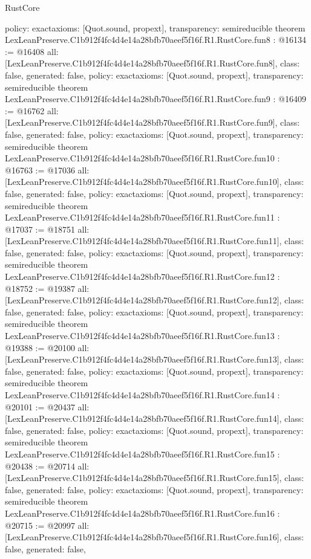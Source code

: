 \begin{lexlean}{RustCore}
\begin{coremodule}
{  policy: exact{axioms: [Quot.sound, propext]},
  transparency: semireducible
}
theorem LexLeanPreserve.C1b912f4fc4d4e14a28bfb70aeef5f16f.R1.RustCore.fun8 : @16134 := @16408 {
  all: [LexLeanPreserve.C1b912f4fc4d4e14a28bfb70aeef5f16f.R1.RustCore.fun8],
  class: false,
  generated: false,
  policy: exact{axioms: [Quot.sound, propext]},
  transparency: semireducible
}
theorem LexLeanPreserve.C1b912f4fc4d4e14a28bfb70aeef5f16f.R1.RustCore.fun9 : @16409 := @16762 {
  all: [LexLeanPreserve.C1b912f4fc4d4e14a28bfb70aeef5f16f.R1.RustCore.fun9],
  class: false,
  generated: false,
  policy: exact{axioms: [Quot.sound, propext]},
  transparency: semireducible
}
theorem LexLeanPreserve.C1b912f4fc4d4e14a28bfb70aeef5f16f.R1.RustCore.fun10 : @16763 := @17036 {
  all: [LexLeanPreserve.C1b912f4fc4d4e14a28bfb70aeef5f16f.R1.RustCore.fun10],
  class: false,
  generated: false,
  policy: exact{axioms: [Quot.sound, propext]},
  transparency: semireducible
}
theorem LexLeanPreserve.C1b912f4fc4d4e14a28bfb70aeef5f16f.R1.RustCore.fun11 : @17037 := @18751 {
  all: [LexLeanPreserve.C1b912f4fc4d4e14a28bfb70aeef5f16f.R1.RustCore.fun11],
  class: false,
  generated: false,
  policy: exact{axioms: [Quot.sound, propext]},
  transparency: semireducible
}
theorem LexLeanPreserve.C1b912f4fc4d4e14a28bfb70aeef5f16f.R1.RustCore.fun12 : @18752 := @19387 {
  all: [LexLeanPreserve.C1b912f4fc4d4e14a28bfb70aeef5f16f.R1.RustCore.fun12],
  class: false,
  generated: false,
  policy: exact{axioms: [Quot.sound, propext]},
  transparency: semireducible
}
theorem LexLeanPreserve.C1b912f4fc4d4e14a28bfb70aeef5f16f.R1.RustCore.fun13 : @19388 := @20100 {
  all: [LexLeanPreserve.C1b912f4fc4d4e14a28bfb70aeef5f16f.R1.RustCore.fun13],
  class: false,
  generated: false,
  policy: exact{axioms: [Quot.sound, propext]},
  transparency: semireducible
}
theorem LexLeanPreserve.C1b912f4fc4d4e14a28bfb70aeef5f16f.R1.RustCore.fun14 : @20101 := @20437 {
  all: [LexLeanPreserve.C1b912f4fc4d4e14a28bfb70aeef5f16f.R1.RustCore.fun14],
  class: false,
  generated: false,
  policy: exact{axioms: [Quot.sound, propext]},
  transparency: semireducible
}
theorem LexLeanPreserve.C1b912f4fc4d4e14a28bfb70aeef5f16f.R1.RustCore.fun15 : @20438 := @20714 {
  all: [LexLeanPreserve.C1b912f4fc4d4e14a28bfb70aeef5f16f.R1.RustCore.fun15],
  class: false,
  generated: false,
  policy: exact{axioms: [Quot.sound, propext]},
  transparency: semireducible
}
theorem LexLeanPreserve.C1b912f4fc4d4e14a28bfb70aeef5f16f.R1.RustCore.fun16 : @20715 := @20997 {
  all: [LexLeanPreserve.C1b912f4fc4d4e14a28bfb70aeef5f16f.R1.RustCore.fun16],
  class: false,
  generated: false,
}
\end{coremodule}
\end{lexlean}
